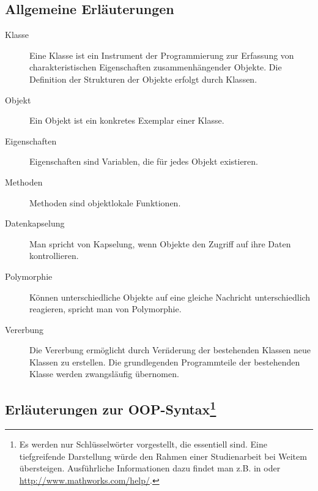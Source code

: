 
\subsection*{Allgemeine Erl\"auterungen}
\begin{description}

	\item[Klasse] Eine Klasse ist ein Instrument der Programmierung zur
	Erfassung von charakteristischen Eigenschaften zusammenh\"angender
	Objekte. Die Definition der Strukturen der Objekte erfolgt durch
	Klassen.

	\item[Objekt] Ein Objekt ist ein konkretes Exemplar einer
	Klasse.

	\item[Eigenschaften] Eigenschaften sind Variablen, die f\"ur jedes
	Objekt existieren.

	\item[Methoden] Methoden sind objektlokale Funktionen.

	\item[Datenkapselung] Man spricht von Kapselung, wenn Objekte den
	Zugriff auf ihre Daten kontrollieren.

	\item[Polymorphie] K\"onnen unterschiedliche Objekte auf eine gleiche
	Nachricht unterschiedlich reagieren, spricht man von Polymorphie.

	\item[Vererbung] Die Vererbung erm\"oglicht durch Ver\"nderung der
	bestehenden Klassen neue Klassen zu erstellen. Die grundlegenden
	Programmteile der bestehenden Klasse werden zwangsl\"aufig
	\"ubernomen.

\end{description}


\subsection*{Erl\"auterungen zur OOP-Syntax\footnote{ Es werden nur
Schl\"usselw\"orter vorgestellt, die essentiell sind. Eine tiefgreifende
Darstellung w\"urde den Rahmen einer Studienarbeit bei Weitem \"ubersteigen.
Ausf\"uhrliche Informationen dazu findet man z.B. in \cite{matlab_kompakt} oder
\url{http://www.mathworks.com/help/}.}}

